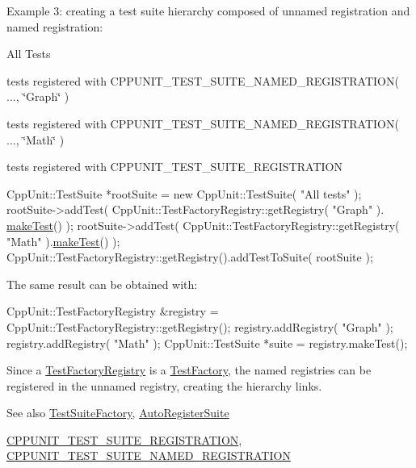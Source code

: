 Example 3\+: creating a test suite hierarchy composed of unnamed registration and named registration\+:
\begin{DoxyItemize}
\item All Tests
\begin{DoxyItemize}
\item tests registered with C\+P\+P\+U\+N\+I\+T\+\_\+\+T\+E\+S\+T\+\_\+\+S\+U\+I\+T\+E\+\_\+\+N\+A\+M\+E\+D\+\_\+\+R\+E\+G\+I\+S\+T\+R\+A\+T\+I\+ON( ..., \char`\"{}\+Graph\char`\"{} )
\item tests registered with C\+P\+P\+U\+N\+I\+T\+\_\+\+T\+E\+S\+T\+\_\+\+S\+U\+I\+T\+E\+\_\+\+N\+A\+M\+E\+D\+\_\+\+R\+E\+G\+I\+S\+T\+R\+A\+T\+I\+ON( ..., \char`\"{}\+Math\char`\"{} )
\item tests registered with C\+P\+P\+U\+N\+I\+T\+\_\+\+T\+E\+S\+T\+\_\+\+S\+U\+I\+T\+E\+\_\+\+R\+E\+G\+I\+S\+T\+R\+A\+T\+I\+ON
\end{DoxyItemize}
\end{DoxyItemize}


\begin{DoxyCode}
CppUnit::TestSuite *rootSuite = \textcolor{keyword}{new} CppUnit::TestSuite( \textcolor{stringliteral}{"All tests"} );
rootSuite->addTest( CppUnit::TestFactoryRegistry::getRegistry( \textcolor{stringliteral}{"Graph"} ).
      \hyperlink{class_test_factory_registry_a75fd01e6d565fb0f576ed1a887655089}{makeTest}() );
rootSuite->addTest( CppUnit::TestFactoryRegistry::getRegistry( \textcolor{stringliteral}{"Math"} ).\hyperlink{class_test_factory_registry_a75fd01e6d565fb0f576ed1a887655089}{makeTest}() );
CppUnit::TestFactoryRegistry::getRegistry().addTestToSuite( rootSuite );
\end{DoxyCode}


The same result can be obtained with\+: 
\begin{DoxyCode}
CppUnit::TestFactoryRegistry &registry = CppUnit::TestFactoryRegistry::getRegistry();
registry.addRegistry( \textcolor{stringliteral}{"Graph"} );
registry.addRegistry( \textcolor{stringliteral}{"Math"} );
CppUnit::TestSuite *suite = registry.makeTest();
\end{DoxyCode}


Since a \hyperlink{class_test_factory_registry}{Test\+Factory\+Registry} is a \hyperlink{class_test_factory}{Test\+Factory}, the named registries can be registered in the unnamed registry, creating the hierarchy links.

\begin{DoxySeeAlso}{See also}
\hyperlink{class_test_suite_factory}{Test\+Suite\+Factory}, \hyperlink{class_auto_register_suite}{Auto\+Register\+Suite} 

\hyperlink{_helper_macros_8h_a70f00cc9f589d24019ee9efee4de2d74}{C\+P\+P\+U\+N\+I\+T\+\_\+\+T\+E\+S\+T\+\_\+\+S\+U\+I\+T\+E\+\_\+\+R\+E\+G\+I\+S\+T\+R\+A\+T\+I\+ON}, \hyperlink{_helper_macros_8h_a028a5855a40ad3836e2a26aa48cd4c91}{C\+P\+P\+U\+N\+I\+T\+\_\+\+T\+E\+S\+T\+\_\+\+S\+U\+I\+T\+E\+\_\+\+N\+A\+M\+E\+D\+\_\+\+R\+E\+G\+I\+S\+T\+R\+A\+T\+I\+ON} 
\end{DoxySeeAlso}


